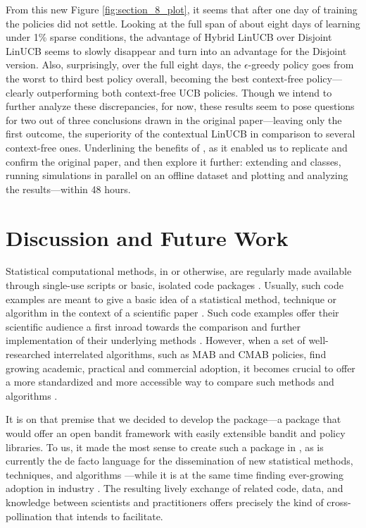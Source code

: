\documentclass{jss}
\begin{document}
From this new Figure \ref{fig:section_8_plot}, it seems that after one day of training the policies did not settle. Looking at the full span of about eight days of learning under 1\% sparse conditions, the advantage of Hybrid LinUCB over Disjoint LinUCB seems to slowly disappear and turn into an advantage for the Disjoint version. Also, surprisingly, over the full eight days, the $\epsilon$-greedy policy goes from the worst to third best policy overall, becoming the best context-free policy---clearly outperforming both context-free UCB policies. Though we intend to further analyze these discrepancies, for now, these results seem to pose questions for two out of three conclusions drawn in the original paper---leaving only the first outcome, the superiority of the contextual LinUCB in comparison to several context-free ones.  Underlining the benefits of , as it enabled us to replicate and confirm the original \cite{Li2010} paper, and then explore it further: extending  and  classes, running simulations in parallel on an offline dataset and plotting and analyzing the results---within 48 hours.

\section{Discussion and Future Work} \label{future}

Statistical computational methods, in  or otherwise, are regularly made available through single-use scripts or basic, isolated code packages \citep{Gandrud2016}. Usually, such code examples are meant to give a basic idea of a statistical method, technique or algorithm in the context of a scientific paper \citep{Stodden2013}. Such code examples offer their scientific audience a first inroad towards the comparison and further implementation of their underlying methods \citep{Buckheit1995}. However, when a set of well-researched interrelated algorithms, such as MAB and CMAB policies, find growing academic, practical and commercial adoption, it becomes crucial to offer a more standardized and more accessible way to compare such methods and algorithms \citep{Mesirov2010}.

It is on that premise that we decided to develop the   package---a package that would offer an open bandit framework with easily extensible bandit and policy libraries. To us, it made the most sense to create such a package in  \citep{RCore}, as  is currently the de facto language for the dissemination of new statistical methods, techniques, and algorithms \citep{Tippmann2015}---while it is at the same time finding ever-growing adoption in industry \citep{2012}. The resulting lively exchange of  related code, data, and knowledge between scientists and practitioners offers precisely the kind of cross-pollination that  intends to facilitate.
\end{document}
